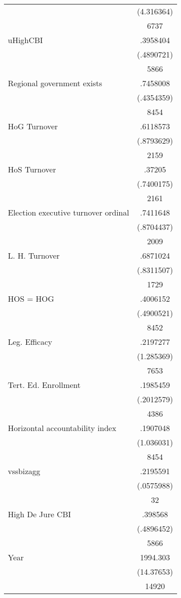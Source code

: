 {\begin{longtable}{l*{1}{c}}
                    &  (4.316364)\\
                    &        6737\\
uHighCBI            &    .3958404\\
                    &  (.4890721)\\
                    &        5866\\
Regional government exists   &    .7458008\\
                    &  (.4354359)\\
                    &        8454\\
HoG Turnover        &    .6118573\\
                    &  (.8793629)\\
                    &        2159\\
HoS Turnover        &      .37205\\
                    &  (.7400175)\\
                    &        2161\\
Election executive turnover ordinal&    .7411648\\
                    &  (.8704437)\\
                    &        2009\\
L. H. Turnover      &    .6871024\\
                    &  (.8311507)\\
                    &        1729\\
HOS = HOG           &    .4006152\\
                    &  (.4900521)\\
                    &        8452\\
Leg. Efficacy       &    .2197277\\
                    &  (1.285369)\\
                    &        7653\\
Tert. Ed. Enrollment&    .1985459\\
                    &  (.2012579)\\
                    &        4386\\
Horizontal accountability index&    .1907048\\
                    &  (1.036031)\\
                    &        8454\\
vssbizagg           &    .2195591\\
                    &  (.0575988)\\
                    &          32\\
High De Jure CBI    &     .398568\\
                    &  (.4896452)\\
                    &        5866\\
Year                &    1994.303\\
                    &  (14.37653)\\
                    &       14920\\
\hline\hline
\end{longtable}
}
